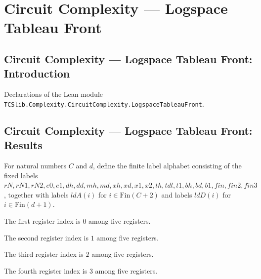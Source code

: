 \section{Circuit Complexity --- Logspace Tableau Front}
\subsection*{Circuit Complexity --- Logspace Tableau Front: Introduction}

Declarations of the Lean module \texttt{TCSlib.Complexity.CircuitComplexity.LogspaceTableauFront}.

\subsection*{Circuit Complexity --- Logspace Tableau Front: Results}

\begin{definition}
\label{Complexity.UTab.Front.Lb}
\leanok
For natural numbers $C$ and $d$, define the finite label alphabet consisting of the
fixed labels
$rN,rN1,rN2,e0,e1,dh,dd,mh,md,xh,xd,x1,x2,th,tdl,t1,bh,bd,b1,fin,fin2,fin3$, together
with labels $ldA(i)$ for $i\in\mathrm{Fin}(C+2)$ and labels $ldD(i)$ for
$i\in\mathrm{Fin}(d+1)$.
\end{definition}

\begin{definition}
\label{Complexity.UTab.Front.rX}
\leanok
The first register index is $0$ among five registers.
\end{definition}

\begin{definition}
\label{Complexity.UTab.Front.rA}
\leanok
The second register index is $1$ among five registers.
\end{definition}

\begin{definition}
\label{Complexity.UTab.Front.rB}
\leanok
The third register index is $2$ among five registers.
\end{definition}

\begin{definition}
\label{Complexity.UTab.Front.rTm}
\leanok
The fourth register index is $3$ among five registers.
\end{definition}

